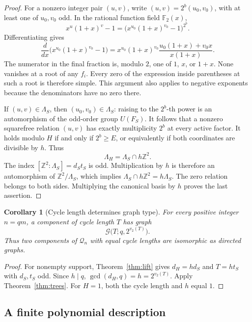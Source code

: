 \documentclass[11pt]{article}
\newtheorem{corollary}[theorem]{Corollary}
\theoremstyle{definition}
\theoremstyle{remark}
\numberwithin{equation}{section}
\newcommand{\F}{\mathbb F_2}
\newcommand{\Z}{\mathbb Z}
\newcommand{\G}{\mathcal G}
\newcommand{\Q}{\mathcal Q}
\begin{document}
\begin{proof}
For a nonzero integer pair $(u,v)$, write
$(u,v)=2^b(u_0,v_0)$, with at least one of $u_0,v_0$ odd. In the
rational function field $\F(x)$,
\[
 x^u(1+x)^v-1=
 \bigl(x^{u_0}(1+x)^{v_0}-1\bigr)^{2^b}.
\]
Differentiating gives
\begin{equation}\label{eq:derivative}
 \frac{d}{dx}\bigl(x^{u_0}(1+x)^{v_0}-1\bigr)
 =x^{u_0}(1+x)^{v_0}
   \frac{u_0(1+x)+v_0x}{x(1+x)}.
\end{equation}
The numerator in the final fraction is, modulo $2$, one of $1$, $x$, or
$1+x$. None vanishes at a root of any $f_i$. Every zero of the expression
inside parentheses at such a root is therefore simple. This argument also
applies to negative exponents because the denominators have no zero there.

If $(u,v)\in\Lambda_S$, then $(u_0,v_0)\in\Lambda_S$: raising to the
$2^b$-th power is an automorphism of the odd-order group $U(F_S)$.
It follows that a nonzero squarefree relation $(u,v)$ has exactly
multiplicity $2^b$ at every active factor. It holds modulo $H$ if and only
if $2^b\ge E$, or equivalently if both coordinates are divisible by $h$.
Thus
\[
 \Lambda_H=\Lambda_S\cap h\Z^2.
\]
The index $[\Z^2:\Lambda_S]=d_St_S$ is odd. Multiplication by $h$ is
therefore an automorphism of $\Z^2/\Lambda_S$, which implies
$\Lambda_S\cap h\Z^2=h\Lambda_S$. The zero relation belongs to both
sides. Multiplying the canonical basis by $h$ proves the last assertion.
\end{proof}

\begin{corollary}[Cycle length determines graph type]\label{cor:cycle-tree}
For every positive integer $n=qm$, a component of cycle length $T$ has
graph
\begin{equation}\label{eq:cycle-tree}
 \G\bigl(T;q,2^{v_2(T)}\bigr).
\end{equation}
Thus two components of $\Q_n$ with equal cycle lengths are isomorphic as
directed graphs.
\end{corollary}

\begin{proof}
For nonempty support, Theorem~\ref{thm:lift} gives $d_H=hd_S$ and
$T=ht_S$ with $d_S,t_S$ odd. Since $h\mid q$,
$\gcd(d_H,q)=h=2^{v_2(T)}$. Apply Theorem~\ref{thm:trees}.
For $H=1$, both the cycle length and $h$ equal $1$.
\end{proof}

\subsection{A finite polynomial description}
\end{document}
